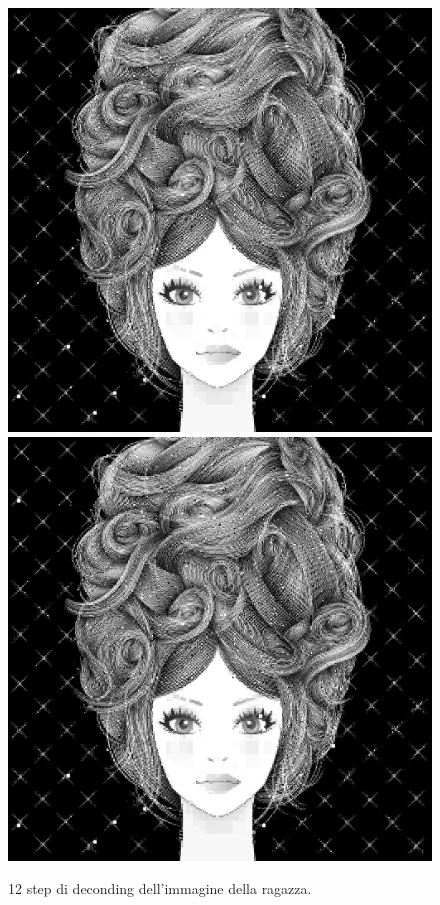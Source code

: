 \documentclass[11pt,a4paper,appendixprefix=true,numbers=noenddot]{scrreprt}
\begin{document}
\begin{figure}[!ht]
\includegraphics[scale=0.35]{images/girl11}
\includegraphics[scale=0.35]{images/girl12}         
\caption{12 step di deconding dell'immagine della ragazza.}
\label{fig:girls}
\end{figure}
\end{document}
